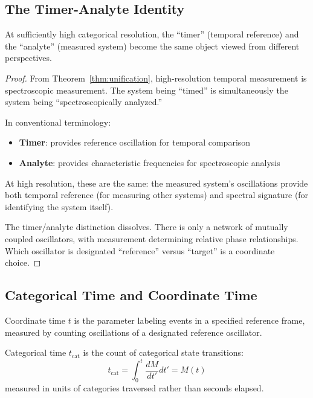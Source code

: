 \subsection{The Timer-Analyte Identity}

\begin{corollary}
\label{cor:timer_analyte}
At sufficiently high categorical resolution, the ``timer'' (temporal reference) and the ``analyte'' (measured system) become the same object viewed from different perspectives.
\end{corollary}

\begin{proof}
From Theorem~\ref{thm:unification}, high-resolution temporal measurement is spectroscopic measurement. The system being ``timed'' is simultaneously the system being ``spectroscopically analyzed.''

In conventional terminology:
\begin{itemize}
\item \textbf{Timer}: provides reference oscillation for temporal comparison
\item \textbf{Analyte}: provides characteristic frequencies for spectroscopic analysis
\end{itemize}

At high resolution, these are the same: the measured system's oscillations provide both temporal reference (for measuring other systems) and spectral signature (for identifying the system itself).

The timer/analyte distinction dissolves. There is only a network of mutually coupled oscillators, with measurement determining relative phase relationships. Which oscillator is designated ``reference'' versus ``target'' is a coordinate choice.
\end{proof}

\subsection{Categorical Time and Coordinate Time}

\begin{definition}
\label{def:coordinate_time}
Coordinate time $t$ is the parameter labeling events in a specified reference frame, measured by counting oscillations of a designated reference oscillator.
\end{definition}

\begin{definition}
\label{def:categorical_time}
Categorical time $t_{\text{cat}}$ is the count of categorical state transitions:
\begin{equation}
t_{\text{cat}} = \int_0^t \frac{dM}{dt'} dt' = M(t)
\end{equation}
measured in units of categories traversed rather than seconds elapsed.
\end{definition}

